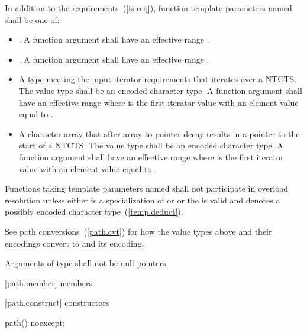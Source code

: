 \pnum
In addition to the requirements~(\ref{fs.req}),
function template parameters named 
shall be one of:
\begin{itemize}
\item {}. A function
  argument   shall have an
  effective range .
\item {}. A function
  argument   shall have an
  effective range .
\item A type meeting the input iterator requirements that iterates over a NTCTS.
  The value type shall be an encoded character type. A function argument
    shall have an effective range
   where  is the first
  iterator value with an element value equal to
  .
\item A character array that after array-to-pointer decay results in a
  pointer to the start of a NTCTS. The value type shall be an encoded character type. A
  function argument   shall
  have an effective range  where
   is the first iterator value with an element value equal to
  .
\end{itemize}

\pnum
Functions taking template parameters named 
shall not participate in overload resolution unless either
 is a specialization of
 or  or
the   is valid and
denotes a possibly  encoded character type~(\ref{temp.deduct}).

\pnum
\begin{note}
See path conversions~(\ref{path.cvt})
for how the value types above and their encodings convert to
 and its encoding.
\end{note}

\pnum
Arguments of type 
shall not be null pointers.

[path.member]{ members}

[path.construct]{ constructors}

%
\begin{itemdecl}
path() noexcept;
\end{itemdecl}

